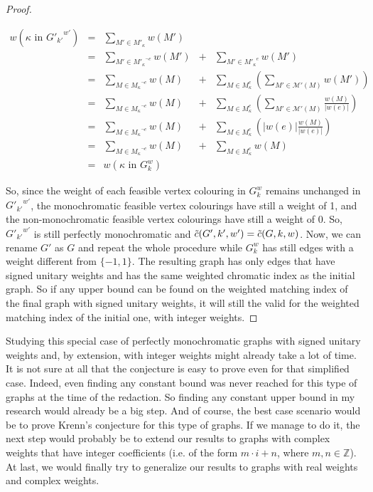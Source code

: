 \begin{proof}
    \begin{center}
        $\begin{array}{lclcl}
            w(\kappa \mbox{ in } {G'_{k'}}^{w'}) 
                & = & \sum\limits_{M' \in M'_{\kappa}} w(M') \\
                & = & \sum\limits_{M' \in {M'_{\kappa}}^{\neg e}} w(M') & + & \sum\limits_{M' \in {M'_{\kappa}}^{e}} w(M') \\
                & = & \sum\limits_{M \in {M_{\kappa}}^{\neg e}} w(M)    & + & \sum\limits_{M \in M_{\kappa}^e} \left( \sum\limits_{M' \in \mathcal{M}'(M)} w(M') \right) \\
                & = & \sum\limits_{M \in {M_{\kappa}}^{\neg e}} w(M)    & + & \sum\limits_{M \in M_{\kappa}^e} \left( \sum\limits_{M' \in \mathcal{M}'(M)} \frac{w(M)}{|w(e)|} \right) \\
                & = & \sum\limits_{M \in {M_{\kappa}}^{\neg e}} w(M)    & + & \sum\limits_{M \in M_{\kappa}^e} \left( |w(e)| \frac{w(M)}{|w(e)|} \right) \\
                & = & \sum\limits_{M \in {M_{\kappa}}^{\neg e}} w(M)    & + & \sum\limits_{M \in M_{\kappa}^e} w(M) \\
                & = & w(\kappa \mbox{ in } G_k^w)
        \end{array}$
    \end{center}

    So, since the weight of each feasible vertex colouring in $G_k^w$ remains unchanged in ${G'_{k'}}^{w'}$, the monochromatic feasible vertex colourings have still a weight of 1, and the non-monochromatic feasible vertex colourings have still a weight of 0. So, ${G'_{k'}}^{w'}$ is still perfectly monochromatic and $\Tilde{c}(G', k', w') = \Tilde{c}(G, k, w)$. Now, we can rename $G'$ as $G$ and repeat the whole procedure while $G_k^w$ has still edges with a weight different from $\{-1, 1\}$. The resulting graph has only edges that have signed unitary weights and has the same weighted chromatic index as the initial graph. So if any upper bound can be found on the weighted matching index of the final graph with signed unitary weights, it will still the valid for the weighted matching index of the initial one, with integer weights.
\end{proof}

Studying this special case of perfectly monochromatic graphs with signed unitary weights and, by extension, with integer weights might already take a lot of time. It is not sure at all that the conjecture is easy to prove even for that simplified case. Indeed, even finding any constant bound was never reached for this type of graphs at the time of the redaction. So finding any constant upper bound in my research would already be a big step. And of course, the best case scenario would be to prove Krenn's conjecture for this type of graphs. If we manage to do it, the next step would probably be to extend our results to graphs with complex weights that have integer coefficients (i.e. of the form $m \cdot i + n$, where $m, n \in \mathbb{Z}$). At last, we would finally try to generalize our results to graphs with real weights and complex weights. 


